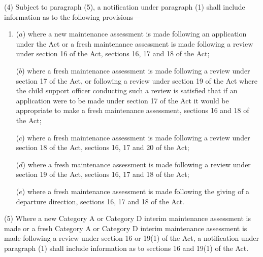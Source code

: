 \documentclass[a4paper]{article}
\begin{document}
(4) 
Subject to paragraph (5), a notification under paragraph (1)  %
shall include information as to the following provisions—
\begin{enumerate}\item[]
($a$) where a new maintenance assessment is made following an application under the Act or a fresh maintenance assessment is made following a review under section 16 of the Act, sections 16, 17 and 18 of the Act;

($b$) where a fresh maintenance assessment is made following a review under section 17 of the Act, or following a review under section 19 of the Act where the child support officer conducting such a review is satisfied that if an application were to be made under section 17 of the Act it would be appropriate to make a fresh maintenance assessment, sections 16 and 18 of the Act;


($c$) where a fresh maintenance assessment is made following a review under section 18 of the Act, sections 16, 17 and 20 of the Act;


($d$) where a fresh maintenance assessment is made following a review under section 19 of the Act, sections 16, 17 and 18 of the Act;

($e$) where a fresh maintenance assessment is made following the giving of a departure direction, sections 16, 17 and 18 of the Act.
\end{enumerate}

(5) Where a new Category A 
or Category D  %
interim maintenance assessment is made or a fresh Category A 
or Category D  %
interim maintenance assessment is made following a review under section 16 or 19(1) of the Act, a notification under paragraph (1) shall include information as to sections 16 and 19(1) of the Act.
\end{document}
